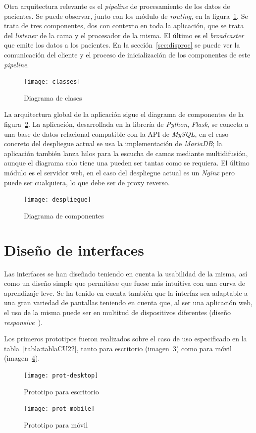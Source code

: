 Otra arquitectura relevante es el \textit{pipeline} de procesamiento de los datos de pacientes. Se puede observar, junto con los módulo de \textit{routing}, en la figura~\ref{fig:classes}. Se trata de tres componentes, dos con contexto en toda la aplicación, que se trata del \textit{listener} de la cama y el procesador de la misma. El último es el \textit{broadcaster} que emite los datos a los pacientes. En la sección~\ref{sec:disproc} se puede ver la comunicación del cliente y el proceso de inicialización de los componentes de este \textit{pipeline}.

\begin{figure}
	\centering
	\texttt{[image: classes]}
	\caption{Diagrama de clases}
	\label{fig:classes}
\end{figure}

La arquitectura global de la aplicación sigue el diagrama de componentes de la figura~\ref{fig:despl}. La aplicación, desarrollada en la librería de \textit{Python}, \textit{Flask}, se conecta a una base de datos relacional compatible con la API de \textit{MySQL}, en el caso concreto del despliegue actual se usa la implementación de \textit{MariaDB}; la aplicación también lanza hilos para la escucha de camas mediante multidifusión, aunque el diagrama solo tiene una pueden ser tantas como se requiera. El último módulo es el servidor web, en el caso del despliegue actual es un \textit{Nginx} pero puede ser cualquiera, lo que debe ser de proxy reverso.

\begin{figure}
	\centering
	\texttt{[image: despliegue]}
	\caption{Diagrama de componentes}
	\label{fig:despl}
\end{figure}

\section{Diseño de interfaces}

Las interfaces se han diseñado teniendo en cuenta la usabilidad de la misma, así como un diseño simple que permitiese que fuese más intuitiva con una curva de aprendizaje leve. Se ha tenido en cuenta también que la interfaz sea adaptable a una gran variedad de pantallas teniendo en cuenta que, al ser una aplicación web, el uso de la misma puede ser en multitud de dispositivos diferentes (diseño \textit{responsive}~\cite{wiki:responsive}).

Los primeros prototipos fueron realizados sobre el caso de uso especificado en la tabla~\ref{tabla:tablaCU22}, tanto para escritorio (imagen~\ref{fig:proto-desk}) como para móvil (imagen~\ref{fig:proto-mob}).

\begin{figure}[h]
	\centering
	\texttt{[image: prot-desktop]}
	\caption{Prototipo para escritorio}
	\label{fig:proto-desk}
\end{figure}

\begin{figure}[h]
	\centering
	\texttt{[image: prot-mobile]}
	\caption{Prototipo para móvil}
	\label{fig:proto-mob}
\end{figure}
